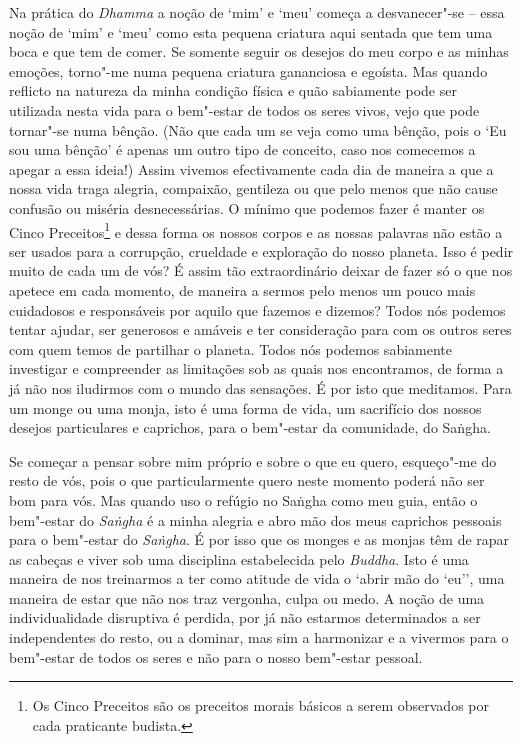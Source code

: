 Na prática do \emph{Dhamma} a noção de `mim' e `meu' começa a
desvanecer"-se -- essa noção de `mim' e `meu' como esta pequena criatura
aqui sentada que tem uma boca e que tem de comer. Se somente seguir os
desejos do meu corpo e as minhas emoções, torno"-me numa pequena criatura
gananciosa e egoísta. Mas quando reflicto na natureza da minha condição
física e quão sabiamente pode ser utilizada nesta vida para o bem"-estar
de todos os seres vivos, vejo que pode tornar"-se numa bênção. (Não que
cada um se veja como uma bênção, pois o `Eu sou uma bênção' é apenas um
outro tipo de conceito, caso nos comecemos a apegar a essa ideia!) Assim
vivemos efectivamente cada dia de maneira a que a nossa vida traga
alegria, compaixão, gentileza ou que pelo menos que não cause confusão
ou miséria desnecessárias. O mínimo que podemos fazer é manter os Cinco
Preceitos\footnote{%
  Os Cinco Preceitos são os preceitos morais básicos a serem observados
  por cada praticante budista.}
e dessa forma os nossos corpos e as nossas palavras não estão
a ser usados para a corrupção, crueldade e exploração do nosso planeta.
Isso é pedir muito de cada um de vós? É assim tão extraordinário deixar
de fazer só o que nos apetece em cada momento, de maneira a sermos pelo
menos um pouco mais cuidadosos e responsáveis por aquilo que fazemos e
dizemos? Todos nós podemos tentar ajudar, ser generosos e amáveis e ter
consideração para com os outros seres com quem temos de partilhar o
planeta. Todos nós podemos sabiamente investigar e compreender as
limitações sob as quais nos encontramos, de forma a já não nos iludirmos
com o mundo das sensações. É por isto que meditamos. Para um monge ou
uma monja, isto é uma forma de vida, um sacrifício dos nossos desejos
particulares e caprichos, para o bem"-estar da comunidade, do Saṅgha.

Se começar a pensar sobre mim próprio e sobre o que eu quero, esqueço"-me
do resto de vós, pois o que particularmente quero neste momento poderá
não ser bom para vós. Mas quando uso o refúgio no Saṅgha como meu guia,
então o bem"-estar do \emph{Saṅgha} é a minha alegria e abro mão dos meus
caprichos
pessoais para o bem"-estar do \emph{Saṅgha}. É por isso que os monges e
as monjas têm de rapar as cabeças e viver sob uma disciplina
estabelecida pelo \emph{Buddha}. Isto é uma maneira de nos treinarmos a
ter como atitude de vida o `abrir mão do `eu'', uma maneira de estar que
não nos traz vergonha, culpa ou medo. A noção de uma individualidade
disruptiva é perdida, por já não estarmos determinados a ser
independentes do resto, ou a dominar, mas sim a harmonizar e a vivermos
para o bem"-estar de todos os seres e não para o nosso bem"-estar pessoal.

